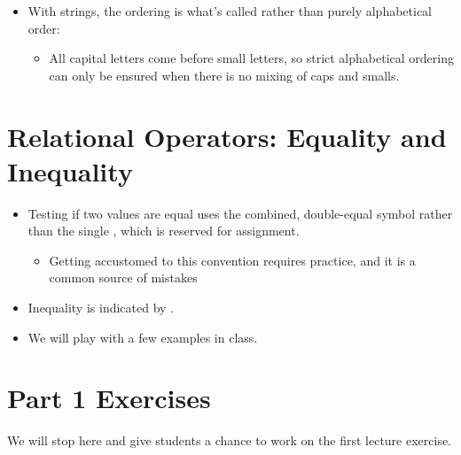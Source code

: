 \documentclass[letterpaper,10pt,english]{sphinxmanual}
\begin{document}
\begin{itemize}
\item {} 
With strings, the ordering is what’s called  rather
than purely alphabetical order:
\begin{itemize}
\item {} 
All capital letters come before small letters, so strict
alphabetical ordering can only be ensured when there is no
mixing of caps and smalls.

\end{itemize}

\end{itemize}


\section{Relational Operators: Equality and Inequality}
\label{\detokenize{lecture_notes/lec06_conditionals1:relational-operators-equality-and-inequality}}\begin{itemize}
\item {} 
Testing if two values are equal uses the combined, double-equal
symbol \sphinxcode{\sphinxupquote{==}} rather than the single \sphinxcode{\sphinxupquote{=}}, which is reserved for
assignment.
\begin{itemize}
\item {} 
Getting accustomed to this convention requires practice, and it
is a common source of mistakes

\end{itemize}

\item {} 
Inequality is indicated by \sphinxcode{\sphinxupquote{!=}}.

\item {} 
We will play with a few examples in class.

\end{itemize}


\section{Part 1 Exercises}
\label{\detokenize{lecture_notes/lec06_conditionals1:part-1-exercises}}
We will stop here and give students a chance to work on the first
lecture exercise.
\end{document}
